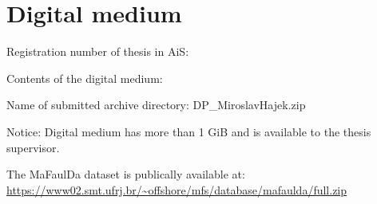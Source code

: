 \thispagestyle{empty}
\setcounter{figure}{0}
\chapter{Digital medium}
\renewcommand*{\thepage}{E-\arabic{page}}
\par Registration number of thesis in AiS: \RegNo
\par Contents of the digital medium:
\par Name of submitted archive directory: DP\_MiroslavHajek.zip
\par Notice: Digital medium has more than 1 GiB and is available to the thesis supervisor.
\par The MaFaulDa dataset is publically available at: \url{https://www02.smt.ufrj.br/~offshore/mfs/database/mafaulda/full.zip}

